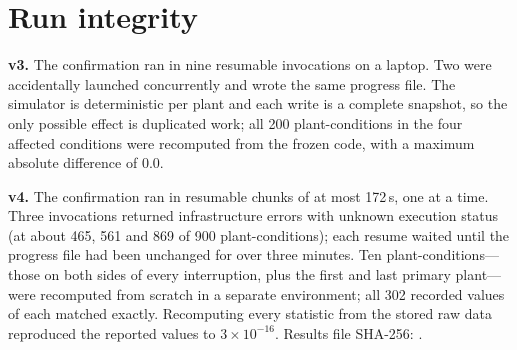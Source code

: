\documentclass[11pt]{article}
\begin{document}
\section{Run integrity}\label{app:integrity}
\textbf{v3.} The confirmation ran in nine resumable invocations on a laptop. Two were accidentally launched concurrently and wrote the same progress file. The simulator is deterministic per plant and each write is a complete snapshot, so the only possible effect is duplicated work; all 200 plant-conditions in the four affected conditions were recomputed from the frozen code, with a maximum absolute difference of 0.0.

\textbf{v4.} The confirmation ran in resumable chunks of at most 172\,s, one at a time. Three invocations returned infrastructure errors with unknown execution status (at about 465, 561 and 869 of 900 plant-conditions); each resume waited until the progress file had been unchanged for over three minutes. Ten plant-conditions---those on both sides of every interruption, plus the first and last primary plant---were recomputed from scratch in a separate environment; all 302 recorded values of each matched exactly. Recomputing every statistic from the stored raw data reproduced the reported values to $3\times10^{-16}$. Results file SHA-256: \texttt{}.
\end{document}
